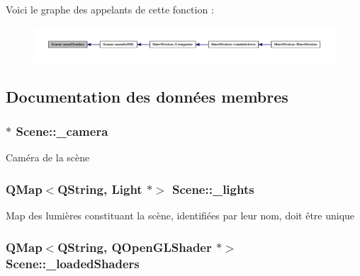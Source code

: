 Voici le graphe des appelants de cette fonction \+:
\nopagebreak
\begin{figure}[H]
\begin{center}
\leavevmode
\includegraphics[width=350pt]{class_scene_abaec7f89a0a039c5a770ce06e80d96cd_icgraph}
\end{center}
\end{figure}




\subsection{Documentation des données membres}
\hypertarget{class_scene_a8cce9e0f96edc8655a9b9a885e2c26bf}{
\subsubsection[{\+\_\+camera}]{$\ast$ Scene\+::\+\_\+camera}}\label{class_scene_a8cce9e0f96edc8655a9b9a885e2c26bf}
Caméra de la scène \hypertarget{class_scene_a0ef33120973d6afc1754d2154d7c338a}{
\subsubsection[{\+\_\+lights}]{\setlength{\rightskip}{0pt plus 5cm}Q\+Map$<$Q\+String, {\bf Light} $\ast$$>$ Scene\+::\+\_\+lights\hspace{0.3cm}{\ttfamily [private]}}}\label{class_scene_a0ef33120973d6afc1754d2154d7c338a}
Map des lumières constituant la scène, identifiées par leur nom, doit être unique \hypertarget{class_scene_a57117e4269465f070fb412f338d28bf4}{
\subsubsection[{\+\_\+loaded\+Shaders}]{\setlength{\rightskip}{0pt plus 5cm}Q\+Map$<$Q\+String, Q\+Open\+G\+L\+Shader $\ast$$>$ Scene\+::\+\_\+loaded\+Shaders\hspace{0.3cm}{\ttfamily [private]}}}\label{class_scene_a57117e4269465f070fb412f338d28bf4}
